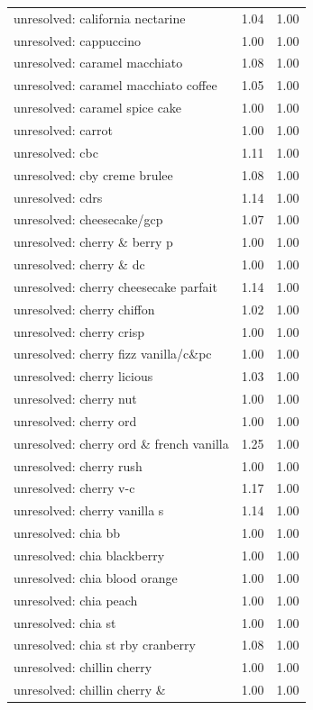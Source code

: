 \begin{table}
\begin{tabular}{lrr}
unresolved: california nectarine & 1.04 & 1.00 \\
unresolved: cappuccino & 1.00 & 1.00 \\
unresolved: caramel macchiato & 1.08 & 1.00 \\
unresolved: caramel macchiato coffee & 1.05 & 1.00 \\
unresolved: caramel spice cake & 1.00 & 1.00 \\
unresolved: carrot & 1.00 & 1.00 \\
unresolved: cbc & 1.11 & 1.00 \\
unresolved: cby creme brulee & 1.08 & 1.00 \\
unresolved: cdrs & 1.14 & 1.00 \\
unresolved: cheesecake/gcp & 1.07 & 1.00 \\
unresolved: cherry \& berry p & 1.00 & 1.00 \\
unresolved: cherry \& dc & 1.00 & 1.00 \\
unresolved: cherry cheesecake parfait & 1.14 & 1.00 \\
unresolved: cherry chiffon & 1.02 & 1.00 \\
unresolved: cherry crisp & 1.00 & 1.00 \\
unresolved: cherry fizz vanilla/c\&pc & 1.00 & 1.00 \\
unresolved: cherry licious & 1.03 & 1.00 \\
unresolved: cherry nut & 1.00 & 1.00 \\
unresolved: cherry ord & 1.00 & 1.00 \\
unresolved: cherry ord \& french vanilla & 1.25 & 1.00 \\
unresolved: cherry rush & 1.00 & 1.00 \\
unresolved: cherry v-c & 1.17 & 1.00 \\
unresolved: cherry vanilla s & 1.14 & 1.00 \\
unresolved: chia bb & 1.00 & 1.00 \\
unresolved: chia blackberry & 1.00 & 1.00 \\
unresolved: chia blood orange & 1.00 & 1.00 \\
unresolved: chia peach & 1.00 & 1.00 \\
unresolved: chia st & 1.00 & 1.00 \\
unresolved: chia st rby cranberry & 1.08 & 1.00 \\
unresolved: chillin cherry & 1.00 & 1.00 \\
unresolved: chillin cherry \& & 1.00 & 1.00 \\

\end{tabular}
\end{table}
